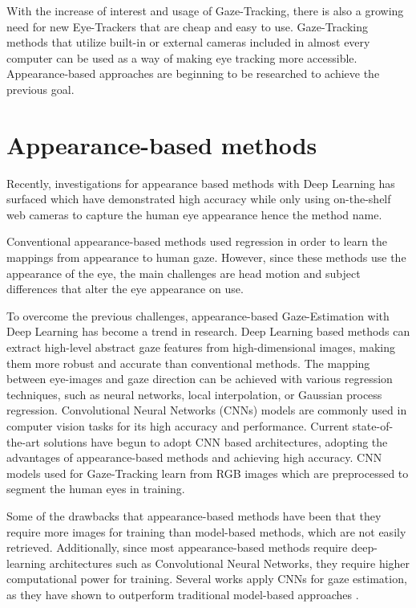 With the increase of interest and usage of Gaze-Tracking, there is also a growing need for new Eye-Trackers that are cheap and easy to use.
Gaze-Tracking methods that utilize built-in or external cameras included in almost every computer can be used as a way of making eye tracking more accessible. Appearance-based approaches are beginning to be researched to achieve the previous goal.

\section{Appearance-based methods}
Recently, investigations for appearance based methods with Deep Learning has surfaced which have demonstrated high accuracy while only using on-the-shelf web cameras to capture the human eye appearance hence the method name.

Conventional appearance-based methods used regression in order to learn the mappings from appearance to human gaze. However, since these methods use the appearance of the eye, the main challenges are head motion and subject differences that alter the eye appearance on use.

To overcome the previous challenges, appearance-based Gaze-Estimation with Deep Learning has become a trend in research. Deep Learning based methods can extract high-level abstract gaze features from high-dimensional images, making them more robust and accurate than conventional methods. The mapping between eye-images and gaze direction can be achieved with various regression techniques, such as neural networks, local interpolation, or Gaussian process regression. Convolutional Neural Networks (CNNs) models are commonly used in computer vision tasks for its high accuracy and performance. 
Current state-of-the-art solutions have begun to adopt CNN based architectures, adopting the advantages of appearance-based methods and achieving high accuracy. CNN models used for Gaze-Tracking learn from RGB images which are preprocessed to segment the human eyes in training.

Some of the drawbacks that appearance-based methods have been that they require more images for training than model-based methods, which are not easily retrieved. Additionally, since most appearance-based methods require deep-learning architectures such as Convolutional Neural Networks, they require higher computational power for training. Several works apply CNNs for gaze estimation, as they have shown to outperform traditional model-based approaches \cite{GazeEstimationInTheWild}.

